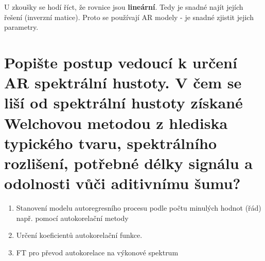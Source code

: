 \documentclass[a4paper,12pt]{article}   %
\begin{document}
U zkoušky se hodí říct, že rovnice jsou \textbf{lineární}. Tedy je snadné najít jejích řešení (inverzní matice). Proto se používají AR modely - je snadné zjistit jejich parametry.

\section{Popište postup vedoucí k určení AR spektrální hustoty. V čem se liší od spektrální hustoty získané Welchovou metodou z hlediska typického tvaru, spektrálního rozlišení, potřebné délky signálu a odolnosti vůči aditivnímu šumu?}
\begin{enumerate}
        \item Stanovení modelu autoregresního procesu podle počtu minulých hodnot (řád) např. pomocí autokorelační metody
        \item Určení koeficientů autokorelační funkce.
        \item FT pro převod autokorelace na výkonové spektrum
\end{enumerate}
\end{document}
